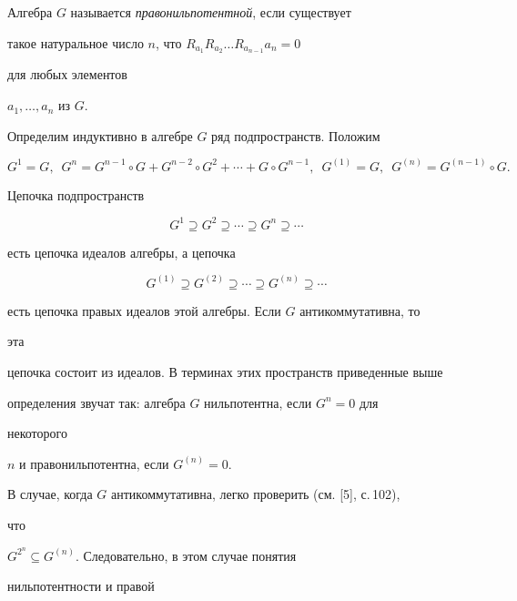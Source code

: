  


\begin{defn} 


Алгебра $G$ называется {\it правонильпотентной}, если существует 


такое натуральное число $n$, что $R_{a_1}R_{a_2}\dotsc R_{a_{n-1}}a_n=0$ 


для любых элементов 


$a_1,\dotsc,a_n$ из $G$. 


\end{defn} 


 


Определим индуктивно в алгебре $G$ ряд подпространств. Положим 


$$ 


G^1=G, \ \; G^n=G^{n-1}\circ G+G^{n-2}\circ G^2+\dotsb+ 


G\circ G^{n-1},\ \; G^{(1)}=G,\ \; G^{(n)}=G^{(n-1)}\circ G. 


$$ 


Цепочка подпространств 


$$ 


G^1\supseteq G^2\supseteq\dotsb\supseteq G^n\supseteq\dotsb 


$$ 


есть цепочка идеалов алгебры, а цепочка 


$$ 


G^{(1)}\supseteq G^{(2)}\supseteq\dotsb\supseteq G^{(n)} 


\supseteq\dotsb 


$$ 


есть цепочка правых идеалов этой алгебры. Если $G$ антикоммутативна, то 


эта 


цепочка состоит из идеалов. В терминах этих пространств приведенные выше 


определения звучат так: алгебра $G$ нильпотентна, если $G^n=0$ для 


некоторого 


$n$ и правонильпотентна, если $G^{(n)}=0$. 


 


В случае, когда $G$ антикоммутативна, легко проверить (см. [5], с.\,102), 


что 


$G^{2^n}\subseteq G^{(n)}$. Следовательно, в этом случае понятия 


нильпотентности и правой 


